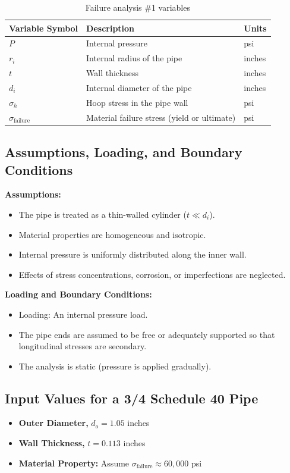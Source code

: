\documentclass[12pt]{report}
\begin{document}
\begin{table}[ht]
\centering
\caption{Failure analysis \#1 variables}
\begin{tabular}{|>{\raggedright}p{2cm}|>{\raggedright}p{6cm}|>{\raggedright\arraybackslash}p{2cm}|}
\hline
\textbf{Variable Symbol} & \textbf{Description} & \textbf{Units} \\
\hline
$P$ & Internal pressure & psi \\
\hline
$r_i$ & Internal radius of the pipe & inches \\
\hline
$t$ & Wall thickness & inches \\
\hline
$d_i$ & Internal diameter of the pipe & inches \\
\hline
$\sigma_h$ & Hoop stress in the pipe wall & psi \\
\hline
$\sigma_{\text{failure}}$ & Material failure stress (yield or ultimate) & psi \\
\hline
\end{tabular}
\end{table}

\subsection{Assumptions, Loading, and Boundary Conditions}
\textbf{Assumptions:}
\begin{itemize}
    \item The pipe is treated as a thin-walled cylinder ($t \ll d_i$).
    \item Material properties are homogeneous and isotropic.
    \item Internal pressure is uniformly distributed along the inner wall.
    \item Effects of stress concentrations, corrosion, or imperfections are neglected.
\end{itemize}

\noindent\textbf{Loading and Boundary Conditions:}
\begin{itemize}
    \item Loading: An internal pressure load.
    \item The pipe ends are assumed to be free or adequately supported so that longitudinal stresses are secondary.
    \item The analysis is static (pressure is applied gradually).
\end{itemize}

\subsection{Input Values for a 3/4 Schedule 40 Pipe}
\begin{itemize}
    \item \textbf{Outer Diameter,} $d_o = 1.05$ inches
    \item \textbf{Wall Thickness,} $t = 0.113$ inches
    \item \textbf{Material Property:} Assume $\sigma_{\text{failure}} \approx 60,000$ psi
\end{itemize}
\end{document}
